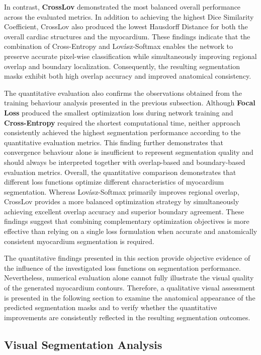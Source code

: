 In contrast, \textbf{CrossLov} demonstrated the most balanced overall performance across the evaluated metrics. In addition to achieving the highest Dice Similarity Coefficient, CrossLov also produced the lowest Hausdorff Distance for both the overall cardiac structures and the myocardium. These findings indicate that the combination of Cross-Entropy and Lovász-Softmax enables the network to preserve accurate pixel-wise classification while simultaneously improving regional overlap and boundary localization. Consequently, the resulting segmentation masks exhibit both high overlap accuracy and improved anatomical consistency.

The quantitative evaluation also confirms the observations obtained from the training behaviour analysis presented in the previous subsection. Although \textbf{Focal Loss} produced the smallest optimization loss during network training and \textbf{Cross-Entropy} required the shortest computational time, neither approach consistently achieved the highest segmentation performance according to the quantitative evaluation metrics. This finding further demonstrates that convergence behaviour alone is insufficient to represent segmentation quality and should always be interpreted together with overlap-based and boundary-based evaluation metrics.
Overall, the quantitative comparison demonstrates that different loss functions optimize different characteristics of myocardium segmentation. Whereas Lovász-Softmax primarily improves regional overlap, CrossLov provides a more balanced optimization strategy by simultaneously achieving excellent overlap accuracy and superior boundary agreement. These findings suggest that combining complementary optimization objectives is more effective than relying on a single loss formulation when accurate and anatomically consistent myocardium segmentation is required.

The quantitative findings presented in this section provide objective evidence of the influence of the investigated loss functions on segmentation performance. Nevertheless, numerical evaluation alone cannot fully illustrate the visual quality of the generated myocardium contours. Therefore, a qualitative visual assessment is presented in the following section to examine the anatomical appearance of the predicted segmentation masks and to verify whether the quantitative improvements are consistently reflected in the resulting segmentation outcomes.

\subsection{Visual Segmentation Analysis}
\label{subsec:ch5-visual-seg-analysis}

